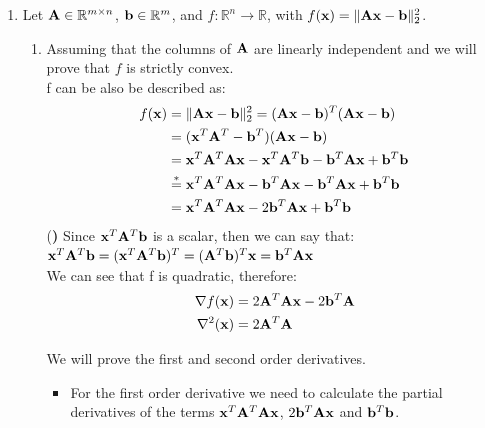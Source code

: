 \documentclass[12pt]{article}
\begin{document}
\begin{enumerate}
\begin{enumerate}
\end{enumerate}
\newpage
\item
Let ${\bf A}\in\mathbb{R}^{m\times n}$, ${\bf b}\in\mathbb{R}^m$, and $f:\mathbb{R}^n\rightarrow \mathbb{R}$, with
$f({\bf x}) = \|{\bf Ax}-{\bf b}\|_2^2$. 
\begin{enumerate}
\item
Assuming that the columns of ${\bf A}$ are linearly independent and we will prove that $f$ is strictly convex.\\
f can be also be described as: 
\begin{equation}
	\begin{split}
		f({\bf x})&=\|{\bf Ax}-{\bf b}\|_2^2=({\bf A}{\bf x}-{\bf b})^T({\bf A}{\bf x}-{\bf b})\\
		&=({\bf x}^T{\bf A}^T-{\bf b}^T)({\bf A}{\bf x}-{\bf b})\\
		&={\bf x}^T{\bf A}^T{\bf A}{\bf x}-{\bf x}^T{\bf A}^T{\bf b}-{\bf b}^T{\bf A}{\bf x}+{\bf b}^T{\bf b}\\
		&\overset{*}{=}{\bf x}^T{\bf A}^T{\bf A}{\bf x}-{\bf b}^T{\bf A}{\bf x}-{\bf b}^T{\bf A}{\bf x}+{\bf b}^T{\bf b}\\
		&={\bf x}^T{\bf A}^T{\bf A}{\bf x}-2{\bf b}^T{\bf A}{\bf x}+{\bf b}^T{\bf b}
	\end{split}
\end{equation}
{(\bf *)} Since ${\bf x}^T{\bf A}^T{\bf b}$ is a scalar, then we can say that:\\
 ${\bf x}^T{\bf A}^T{\bf b}=({\bf x}^T{\bf A}^T{\bf b})^T=({\bf A}^T{\bf b})^T{\bf x}={\bf b}^T{\bf A}{\bf x}$\\
 
We can see that f is quadratic, therefore:
\begin{equation}
	\begin{split}
		\nabla f({\bf x}) &= 2{\bf A}^T{\bf A}{\bf x}-2{\bf b}^T{\bf A}\\
		\nabla^2(\bf x) & = 2{\bf A}^T{\bf A}
	\end{split}
\end{equation}

We will prove the first and second order derivatives.\\
\begin{itemize}
	\item
	For the first order derivative we need to calculate the partial derivatives of the terms ${\bf x}^T{\bf A}^T{\bf A}{\bf x}$, $2{\bf b}^T{\bf A}{\bf x}$ and ${\bf b}^T{\bf b}$.\\
	

\end{itemize}
\end{enumerate}
\end{enumerate}
\end{document}
